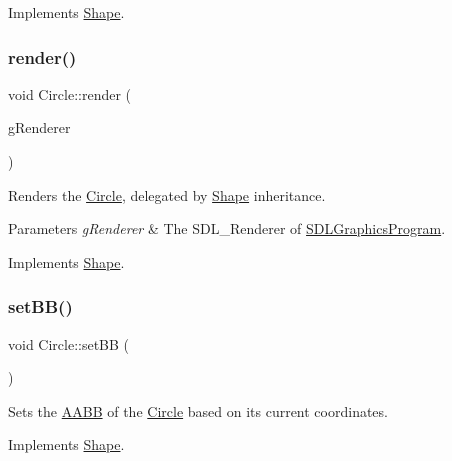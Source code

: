 Implements \mbox{\hyperlink{class_shape_a3918812ff3a143dabbeba2f650fb5e7c}{Shape}}.

\mbox{\label{class_circle_a7236be8080b9ab07f5c26e34aa17c9ae}} 
\subsubsection{\texorpdfstring{render()}{render()}}
{\footnotesize\ttfamily void Circle\+::render (\begin{DoxyParamCaption}\item[{S\+D\+L\+\_\+\+Renderer $\ast$}]{g\+Renderer }\end{DoxyParamCaption})\hspace{0.3cm}{\ttfamily [virtual]}}



Renders the \mbox{\hyperlink{class_circle}{Circle}}, delegated by \mbox{\hyperlink{class_shape}{Shape}} inheritance. 


\begin{DoxyParams}{Parameters}
{\em g\+Renderer} & The S\+D\+L\+\_\+\+Renderer of \mbox{\hyperlink{class_s_d_l_graphics_program}{S\+D\+L\+Graphics\+Program}}. \\
\hline
\end{DoxyParams}


Implements \mbox{\hyperlink{class_shape_a07881321ba401e7cdbd83b4f2b009e37}{Shape}}.

\mbox{\label{class_circle_ab33a020a2b85fbda10aa82c6e8c25327}} 
\subsubsection{\texorpdfstring{setBB()}{setBB()}}
{\footnotesize\ttfamily void Circle\+::set\+BB (\begin{DoxyParamCaption}{ }\end{DoxyParamCaption})\hspace{0.3cm}{\ttfamily [virtual]}}



Sets the \mbox{\hyperlink{class_a_a_b_b}{A\+A\+BB}} of the \mbox{\hyperlink{class_circle}{Circle}} based on its current coordinates. 



Implements \mbox{\hyperlink{class_shape_a540779eb247ef00e4fb262f1f81e90d4}{Shape}}.

